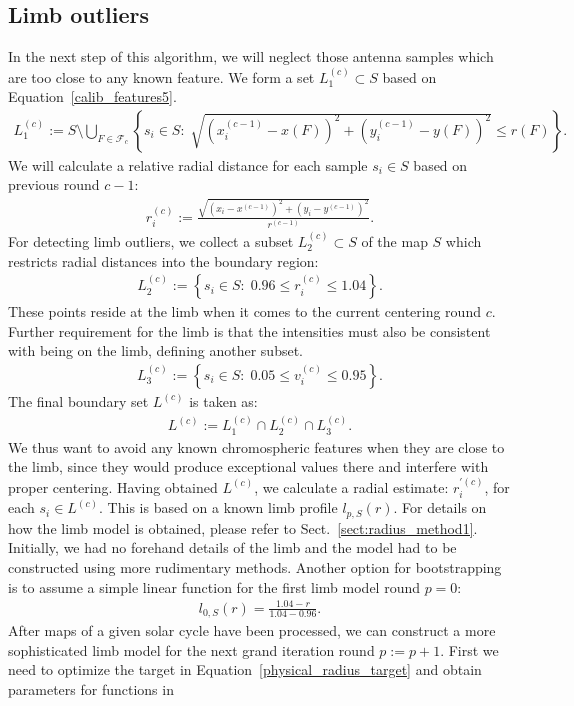 \documentclass{aa}
\newcommand{\eqnl}[2]{\begin{eqnarray}\label{#1}#2\end{eqnarray}}
\begin{document}
  \subsection{Limb outliers} \label{sect:outliers_limb}

  In the next step of this algorithm, we will neglect those antenna samples which are too close to any known feature. We form a set $L^{(c)}_1 \subset S$ based on Equation~\ref{calib_features5}.
  \eqnl{calib_features6}{
  L^{(c)}_1 := S \setminus \bigcup \limits_{F \in \mathcal{F}_c} \left\{ s_i \in S: \; \sqrt{\left( x^{(c-1)}_i - x(F) \right)^2 + \left( y^{(c-1)}_i - y(F) \right)^2} \le r(F) \right\} \text{.}
  }
  We will calculate a relative radial distance for each sample $s_i \in S$ based on previous round $c-1$:
  \eqnl{calib_radial_distance}{
  r_i^{(c)} := \frac{\sqrt{\left( x_i - x^{(c-1)} \right)^2 + \left( y_i - y^{(c-1)} \right)^2}}{r^{(c-1)}} \text{.}
  }
  For detecting limb outliers, we collect a subset $L^{(c)}_2 \subset S$ of the map $S$ which restricts radial distances into the boundary region:
  \eqnl{calib_subset1}{
  L^{(c)}_2 := \left\{ s_i \in S:\; 0.96 \le r_i^{(c)} \le 1.04 \right\} \text{.}
  }
  These points reside at the limb when it comes to the current centering round $c$. Further requirement for the limb is that the intensities must also be consistent with being on the limb, defining another subset.
  \eqnl{calib_subset2}{
  L^{(c)}_3 := \left\{ s_i \in S:\; 0.05 \le v_i^{(c)} \le 0.95 \right\} \text{.}
  }
  The final boundary set $L^{(c)}$ is taken as:
  \eqnl{calib_subset3}{
  L^{(c)} := L^{(c)}_1 \cap L^{(c)}_2 \cap L^{(c)}_3 \text{.}
  }
  We thus want to avoid any known chromospheric features when they are close to the limb, since they would produce 
  exceptional values there and interfere with proper centering. Having obtained $L^{(c)}$, we calculate a radial 
  estimate: $r_i^{\prime(c)}$, for each $s_i \in L^{(c)}$. This is based on a known limb profile $l_{p,S}(r)$. For details on how the 
  limb model is obtained, please refer to Sect.~\ref{sect:radius_method1}. Initially, we had no forehand details of 
  the limb and the model had to be constructed using more rudimentary methods. Another option for bootstrapping is to assume a simple linear function for the first limb model round $p=0$:
  \eqnl{calib_limbmodel1}{
  l_{0,S}(r) = \frac{1.04 - r}{1.04 - 0.96} \text{.}
  }
  After maps of a given solar cycle have been processed, we can construct a more sophisticated limb model for the next grand iteration round $p := p+1$. First we need 
  to optimize the target in Equation~\ref{physical_radius_target} and obtain parameters for functions in 
\end{document}
